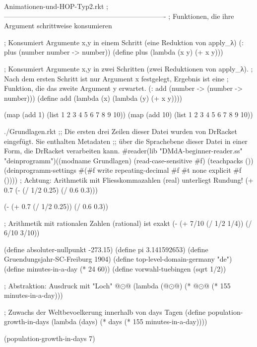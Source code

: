 \begin{filecontents*}{Animationen-und-HOP-Typ2.rkt}
; ----------------------------------------------------------------------
; Funktionen, die ihre Argument schrittweise konsumieren

; Konsumiert Argumente x,y in einem Schritt (eine Reduktion von apply_λ)
(: plus (number number -> number))
(define plus
  (lambda (x y)
    (+ x y)))

; Konsumiert Argumente x,y in zwei Schritten (zwei Reduktionen von apply_λ).
; Nach dem ersten Schritt ist nur Argument x festgelegt, Ergebnis ist eine
; Funktion, die das zweite Argument y erwartet.
(: add (number -> (number -> number)))
(define add
  (lambda (x)
    (lambda (y)
      (+ x y))))

(map (add 1)  (list 1 2 3 4 5 6 7 8 9 10))
(map (add 10) (list 1 2 3 4 5 6 7 8 9 10))




\end{filecontents*}
\begin{filecontents*}{./Grundlagen.rkt}
;; Die ersten drei Zeilen dieser Datei wurden von DrRacket eingefügt. Sie enthalten Metadaten
;; über die Sprachebene dieser Datei in einer Form, die DrRacket verarbeiten kann.
#reader(lib "DMdA-beginner-reader.ss" "deinprogramm")((modname Grundlagen) (read-case-sensitive #f) (teachpacks ()) (deinprogramm-settings #(#f write repeating-decimal #f #t none explicit #f ())))
; Achtung: Arithmetik mit Fliesskommazahlen (real)
unterliegt Rundung!
(+ 0.7
(- (/ 1/2 0.25)
(/ 0.6 0.3)))

(- (+ 0.7
(/ 1/2 0.25))
(/ 0.6 0.3))

; Arithmetik mit rationalen Zahlen (rational) ist exakt
(- (+ 7/10
(/ 1/2 1/4))
(/ 6/10 3/10))

(define absoluter-nullpunkt -273.15)
(define pi 3.141592653)
(define Gruendungsjahr-SC-Freiburg 1904)
(define top-level-domain-germany "de")
(define minutes-in-a-day (* 24 60))
(define vorwahl-tuebingen (sqrt 1/2))

; Abstraktion: Ausdruck mit "Loch" @$\odot$@
(lambda (@$\odot$@) (* @$\odot$@ (* 155 minutes-in-a-day)))


; Zuwachs der Weltbevoelkerung innerhalb von days Tagen
(define population-growth-in-days
(lambda (days) (* days (* 155 minutes-in-a-day))))

(population-growth-in-days 7)
\end{filecontents*}
